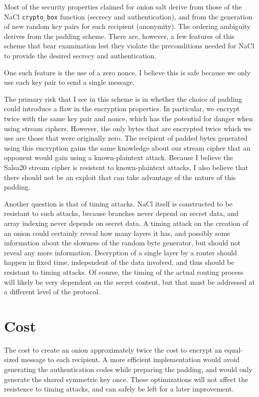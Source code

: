 \documentclass[letterpaper,twocolumn,amsmath,amssymb,pre,aps,10pt]{revtex4-1}
\begin{document}
Most of the security properties claimed for onion salt derive from
those of the NaCl \texttt{crypto\_box} function (secrecy and
authentication), and from the generation of new random key pairs for
each recipient (anonymity).  The ordering ambiguity derives from the
padding scheme.  There are, however, a few features of this scheme
that bear examination lest they violate the preconditions needed for
NaCl to provide the desired secrecy and authentication.

One such feature is the use of a zero nonce.  I believe this is safe
because we only use each key pair to send a single message.

The primary risk that I see in this scheme is in whether the choice of
padding could introduce a flaw in the encryption properties.  In
particular, we encrypt twice with the same key pair and nonce, which
has the potential for danger when using stream ciphers.  However, the
only bytes that are encrypted twice which we use are those that were
originally zero.  The recipient of padded bytes generated using this
encryption gains the same knowledge about our stream cipher that an
opponent would gain using a known-plaintext attack.  Because I believe
the Salsa20 stream cipher is resistent to known-plaintext attacks, I
also believe that there should not be an exploit that can take
advantage of the nature of this padding.

Another question is that of timing attacks.  NaCl itself is
constructed to be resistant to such attacks, because branches never
depend on secret data, and array indexing never depends on secret
data.  A timing attack on the creation of an onion could certainly
reveal how many layers it has, and possibly some information about the
slowness of the random byte generator, but should not reveal any more
information.  Decryption of a single layer by a router should happen
in fixed time, independent of the data involved, and thus should be
resistant to timing attacks.  Of course, the timing of the actual
routing process will likely be very dependent on the secret content,
but that must be addressed at a different level of the protocol.

\section{Cost}

The cost to create an onion approximately twice the cost to encrypt an
equal-sized message to each recipient.  A more efficient
implementation would avoid generating the authentication codes while
preparing the padding, and would only generate the shared symmetric
key once.  These optimizations will not affect the resistence to
timing attacks, and can safely be left for a later improvement.
\end{document}
